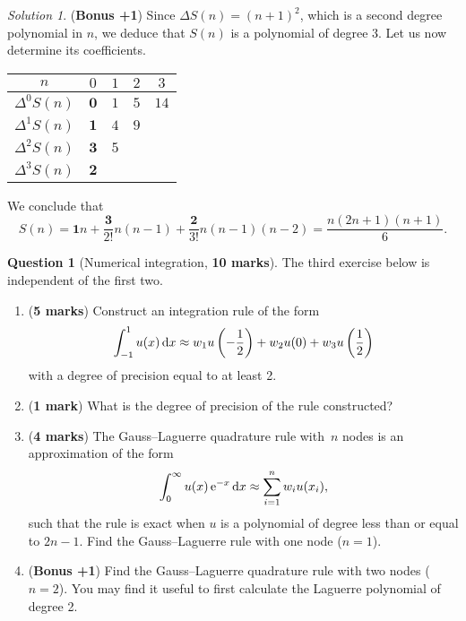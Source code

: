 \documentclass[11pt]{article}
\theoremstyle{definition}
\newtheorem{question}{Question}
\theoremstyle{remark}
\newtheorem*{solution}{Solution}
\begin{document}
\begin{solution}
    \noindent (\textbf{Bonus +1}) 
    Since $\Delta S(n) = (n+1)^2$,
    which is a second degree polynomial in $n$,
    we deduce that $S(n)$ is a polynomial of degree 3.
    Let us now determine its coefficients.
    \begin{center}
    \begin{tabular}{|c|c|c|c|c|}
        \hline
        $n$    & $0$ & $1$ & $2$ & $3$ \\ \hline
        $\Delta^0 S(n)$ & $\mathbf{0}$ & $1$ & $5$ & $14$ \\ \hline
        $\Delta^1 S(n)$ & $\mathbf{1}$ & $4$ & $9$ &  \\ \hline
        $\Delta^2 S(n)$ & $\mathbf{3}$ & $5$ & & \\ \hline
        $\Delta^3 S(n)$ & $\mathbf{2}$ & & & \\ \hline
    \end{tabular}
    \end{center}
    We conclude that
    \[
        S(n) = \mathbf{1} n + \frac{\mathbf{3}}{2!} n(n-1) + \frac{\mathbf{2}}{3!} n(n-1)(n-2)
        = \frac{n (2n+1) (n+1)}{6}.
    \]
\end{solution}

\newpage
\begin{question}
    [Numerical integration, \textbf{10 marks}]
    The third exercise below is independent of the first two.
    \begin{enumerate}
        \item (\textbf{5 marks})
            Construct an integration rule of the form
            \[
                \int_{-1}^{1} u(x) \, \mathrm d x \approx w_1 u\left(-\frac{1}{2} \right) + w_2 u(0) +  w_3 u\left(\frac{1}{2} \right)
            \]
            with a degree of precision equal to at least 2.

        \item
            (\textbf{1 mark})
            What is the degree of precision of the rule constructed?

        \item
            (\textbf{4 marks})
            The Gauss--Laguerre quadrature rule with~$n$ nodes is an approximation of the form
            \[
                \int_{0}^{\infty} u(x) \, \mathrm e^{-x} \, \mathrm d x \approx \sum_{i=1}^{n} w_i u(x_i),
            \]
            such that the rule is exact when $u$ is a polynomial of degree less than or equal to $2n-1$.
            Find the Gauss--Laguerre rule with one node ($n = 1$).

        \item (\textbf{Bonus +1})
            Find the Gauss--Laguerre quadrature rule with two nodes ($n = 2$).
            You may find it useful to first calculate the Laguerre polynomial of degree 2.
    \end{enumerate}
\end{question}
\end{document}
